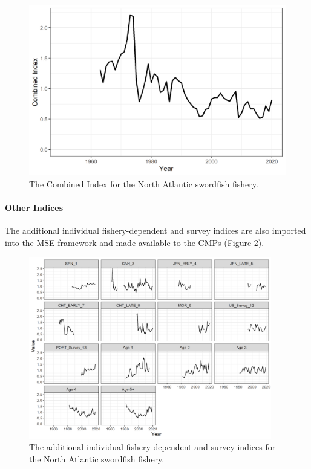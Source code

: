 \documentclass[
]{article}
\begin{document}
\begin{figure}
\includegraphics[width=25in]{../../img/Combined_Index} \caption{The Combined Index for the North Atlantic swordfish fishery.}\label{fig:index-plot}
\end{figure}

\hypertarget{other-indices}{%
\paragraph{Other Indices}\label{other-indices}}

The additional individual fishery-dependent and survey indices are also imported into the MSE framework and made available to the CMPs (Figure \ref{fig:addindex-plot}).

\begin{figure}
\includegraphics[width=400px]{../../img/Individual_Indices} \caption{The additional individual fishery-dependent and survey indices for the North Atlantic swordfish fishery.}\label{fig:addindex-plot}
\end{figure}
\end{document}
